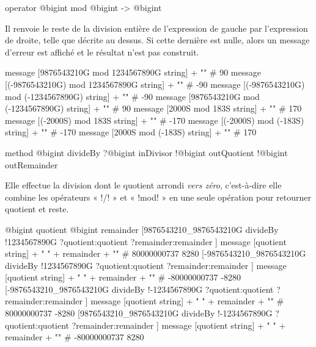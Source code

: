 \begin{galgas4box}
operator @bigint mod @bigint -> @bigint
\end{galgas4box}

Il renvoie le reste de la division entière de l'expression de gauche par l'expression de droite, telle que décrite au dessus. Si cette dernière est nulle, alors un message d'erreur est affiché et le résultat n'est pas construit.

\begin{galgas4}
message [9876543210G mod 1234567890G string] + "\n" # 90
message [(-9876543210G) mod 1234567890G string] + "\n" # -90
message [(-9876543210G) mod (-1234567890G) string] + "\n"  # -90
message [9876543210G mod (-1234567890G) string] + "\n"  # 90
message [2000S mod 183S string] + "\n" # 170
message [(-2000S) mod 183S string] + "\n" # -170
message [(-2000S) mod (-183S) string] + "\n" # -170
message [2000S mod (-183S) string] + "\n" # 170
\end{galgas4}





\begin{galgas4box}
method @bigint divideBy ?@bigint inDivisor
                        !@bigint outQuotient
                        !@bigint outRemainder
\end{galgas4box}

Elle effectue la division dont le quotient arrondi \emph{vers zéro}, c'est-à-dire elle combine les opérateurs « \ggsq!/! » et « \ggsq!mod! » en une seule opération pour retourner quotient et reste.

\begin{galgas4}
@bigint quotient
@bigint remainder
[9876543210_9876543210G divideBy
  !1234567890G
  ?quotient:quotient
  ?remainder:remainder
]
message [quotient string] + " " + remainder + "\n" # 80000000737 8280
[-9876543210_9876543210G divideBy
  !1234567890G
  ?quotient:quotient
  ?remainder:remainder
]
message [quotient string] + " " + remainder + "\n" # -80000000737 -8280
[-9876543210_9876543210G divideBy
  !-1234567890G
  ?quotient:quotient
  ?remainder:remainder
]
message [quotient string] + " " + remainder + "\n" # 80000000737 -8280
[9876543210_9876543210G divideBy
  !-1234567890G
  ?quotient:quotient
  ?remainder:remainder
]
message [quotient string] + " " + remainder + "\n" # -80000000737 8280
\end{galgas4}





